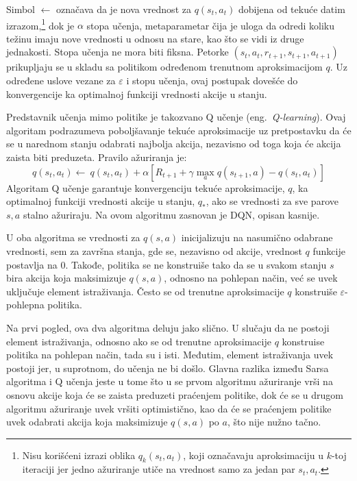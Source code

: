 Simbol $\leftarrow$ označava da je nova vrednost za $q(s_t, a_t)$ dobijena od tekuće datim izrazom,\footnote{Nisu korišćeni izrazi oblika $q_k(s_t, a_t)$, koji označavaju aproksimaciju u $k$-toj iteraciji jer jedno ažuriranje utiče na vrednost samo za jedan par $s_t, a_t$.} dok je $\alpha$ stopa učenja, metaparametar čija je uloga da odredi koliku težinu imaju nove vrednosti u odnosu na stare, kao što se vidi iz druge jednakosti. Stopa učenja ne mora biti fiksna.
Petorke $(s_t, a_t, r_{t+1}, s_{t+1}, a_{t+1})$ prikupljaju se u skladu sa politikom određenom trenutnom aproksimacijom $q$. Uz određene uslove vezane za $\varepsilon$ i stopu učenja, ovaj postupak dovešće do konvergencije ka optimalnoj funkciji vrednosti akcije u stanju.
\par 
Predstavnik učenja mimo politike je takozvano Q učenje (eng.~{\em Q-learning}). Ovaj algoritam podrazumeva poboljšavanje tekuće aproksimacije uz pretpostavku da će se u narednom stanju odabrati najbolja akcija, nezavisno od toga koja će akcija zaista biti preduzeta. Pravilo ažuriranja je:
\begin{equation}
	\label{eq:q_ucenje}
		q(s_t, a_t) \leftarrow ~q(s_t, a_t) + \alpha [ R_{t+1} + \gamma \max_a q(s_{t+1}, a) - q(s_t, a_t)]
\end{equation}
Algoritam Q učenje garantuje konvergenciju tekuće aproksimacije, $q$, ka optimalnoj funkciji vrednosti akcije u stanju, $q_*$, ako se vrednosti za sve parove $s, a$ stalno ažuriraju. Na ovom algoritmu zasnovan je DQN, opisan kasnije.
\par 
U oba algoritma se vrednosti za $q(s,a)$ inicijalizuju na nasumično odabrane vrednosti, sem za završna stanja, gde se, nezavisno od akcije, vrednost $q$ funkcije postavlja na $0$. Takođe, politika se ne konstruiše tako da se u svakom stanju $s$ bira akcija koja maksimizuje $q(s,a)$, odnosno na pohlepan način, već se uvek uključuje element istraživanja. Često se od trenutne aproksimacije $q$ konstruiše $\varepsilon$-pohlepna politika. 
\par 
Na prvi pogled, ova dva algoritma deluju jako slično. U slučaju da ne postoji element istraživanja, odnosno ako se od trenutne aproksimacije $q$ konstruise politika na pohlepan način, tada su i isti. Međutim, element istraživanja uvek postoji jer, u suprotnom, do učenja ne bi došlo. Glavna razlika između Sarsa algoritma i Q učenja jeste u tome što u se prvom algoritmu ažuriranje vrši na osnovu akcije koja će se zaista preduzeti praćenjem politike, dok će se u drugom algoritmu ažuriranje uvek vršiti optimistično, kao da će se praćenjem politike uvek odabrati akcija koja maksimizuje $q(s,a)$ po $a$, što nije nužno tačno. 
